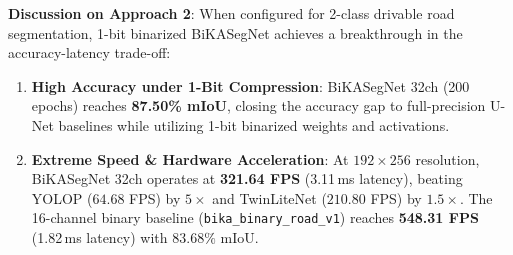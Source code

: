 \documentclass[a4paper]{report}
\begin{document}
\begin{table}[htbp]
\centering
\caption{Approach 2: Binary Road / Drivable Area Segmentation (2 Classes) on BDD100K.}
\label{tab:approach2_table}
\end{table}

\textbf{Discussion on Approach 2}:
When configured for 2-class drivable road segmentation, 1-bit binarized BiKASegNet achieves a breakthrough in the accuracy-latency trade-off:
\begin{enumerate}
    \item \textbf{High Accuracy under 1-Bit Compression}: BiKASegNet 32ch (200 epochs) reaches \textbf{87.50\% mIoU}, closing the accuracy gap to full-precision U-Net baselines while utilizing 1-bit binarized weights and activations.
    \item \textbf{Extreme Speed \& Hardware Acceleration}: At $192 \times 256$ resolution, BiKASegNet 32ch operates at \textbf{321.64 FPS} (3.11\,ms latency), beating YOLOP ($64.68$ FPS) by $5\times$ and TwinLiteNet ($210.80$ FPS) by $1.5\times$. The 16-channel binary baseline (\texttt{bika\_binary\_road\_v1}) reaches \textbf{548.31 FPS} (1.82\,ms latency) with $83.68\%$ mIoU.
\end{enumerate}
\end{document}
